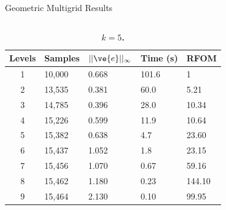 \documentclass{beamer}
\begin{document}
\begin{frame}{Geometric Multigrid Results}
\begin{columns}
\begin{column}{0.5\textwidth}
      { \tiny
        \begin{table}[h!]
          \begin{center}
            \begin{tabular}{cllll}\hline\hline
              \multicolumn{1}{c}{\textbf{Levels}} & 
              \multicolumn{1}{l}{\textbf{Samples}} & 
              \multicolumn{1}{l}{\textbf{$||\ve{e}||_{\infty}$}} & 
              \multicolumn{1}{l}{\textbf{Time (s)}} & 
              \multicolumn{1}{l}{\textbf{RFOM}} \\
              \hline
              1 & 10,000 & 0.668 & 101.6 & 1 \\
              2 & 13,535 & 0.381 & 60.0 & 5.21 \\
              3 & 14,785 & 0.396 & 28.0 & 10.34 \\
              4 & 15,226 & 0.599 & 11.9 & 10.64 \\
              5 & 15,382 & 0.638 & 4.7 & 23.60 \\
              6 & 15,437 & 1.052 & 1.8 & 23.15 \\
              7 & 15,456 & 1.070 & 0.67 & 59.16 \\
              8 & 15,462 & 1.180 & 0.23 & 144.10 \\
              9 & 15,464 & 2.130 & 0.10 & 99.95 \\
              \hline\hline
            \end{tabular}
          \end{center}
          \caption{\textbf{$k = 5$.}}
          \label{tab:k5_results}
        \end{table}
      }

    \end{column}

    \begin{column}{0.5\textwidth}


\end{column}
\end{columns}
\end{frame}
\end{document}
